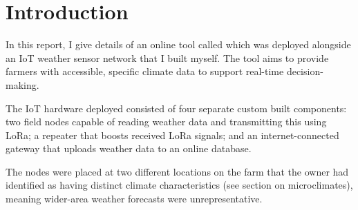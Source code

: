 \section{Introduction}

In this report, I give details of an online tool called \myReportTitle{} which
was deployed alongside an IoT weather sensor network that I built myself. The
tool aims to provide farmers with accessible, specific climate data to support
real-time decision-making.

The IoT hardware deployed consisted of four separate custom built components:
two field nodes capable of reading weather data and transmitting this using
LoRa; a repeater that boosts received LoRa signals; and an internet-connected
gateway that uploads weather data to an online database. 

The nodes were placed at two different locations on the farm that the owner had
identified as having distinct climate characteristics (see section on
microclimates), meaning wider-area weather forecasts were unrepresentative.

